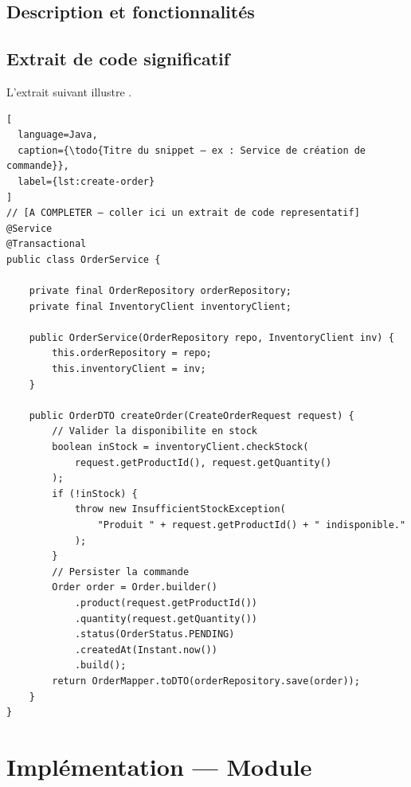 \subsection{Description et fonctionnalités}


\subsection{Extrait de code significatif}

L'extrait suivant illustre .

\begin{lstlisting}[
  language=Java,
  caption={\todo{Titre du snippet — ex : Service de création de commande}},
  label={lst:create-order}
]
// [A COMPLETER — coller ici un extrait de code representatif]
@Service
@Transactional
public class OrderService {

    private final OrderRepository orderRepository;
    private final InventoryClient inventoryClient;

    public OrderService(OrderRepository repo, InventoryClient inv) {
        this.orderRepository = repo;
        this.inventoryClient = inv;
    }

    public OrderDTO createOrder(CreateOrderRequest request) {
        // Valider la disponibilite en stock
        boolean inStock = inventoryClient.checkStock(
            request.getProductId(), request.getQuantity()
        );
        if (!inStock) {
            throw new InsufficientStockException(
                "Produit " + request.getProductId() + " indisponible."
            );
        }
        // Persister la commande
        Order order = Order.builder()
            .product(request.getProductId())
            .quantity(request.getQuantity())
            .status(OrderStatus.PENDING)
            .createdAt(Instant.now())
            .build();
        return OrderMapper.toDTO(orderRepository.save(order));
    }
}
\end{lstlisting}


\section{Implémentation — Module }
\label{sec:real:moduleB}

